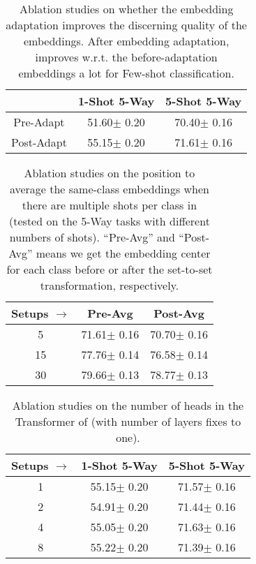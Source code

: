 \begin{table}[tbp]
	\small
	\tabcolsep 5pt
	\centering
	\caption{Ablation studies on whether the embedding adaptation improves the discerning quality of the embeddings. After embedding adaptation, \feat improves w.r.t. the before-adaptation embeddings a lot for Few-shot classification.}
	\begin{tabular}{@{\;}ccc@{\;}}
		\addlinespace
		\toprule
		& 1-Shot 5-Way   & 5-Shot 5-Way \\
		\midrule
		Pre-Adapt    & 51.60{\tiny $\pm$ 0.20}  & 70.40{\tiny $\pm$ 0.16} \\
		Post-Adapt  & 55.15{\tiny $\pm$ 0.20}  & 71.61{\tiny $\pm$ 0.16} \\
		\bottomrule
	\end{tabular}
	\label{supp-tab:adapt_ablation}
\end{table}

\begin{table}[tbp]
	\small
	\tabcolsep 5pt
	\centering
	\caption{Ablation studies on the position to average the same-class embeddings when there are multiple shots per class in {\feat} (tested on the 5-Way tasks with different numbers of shots). ``Pre-Avg'' and ``Post-Avg'' means we get the embedding center for each class before or after the set-to-set transformation, respectively.}
	\begin{tabular}{@{\;}ccc@{\;}}
		\addlinespace
		\toprule
		Setups $\rightarrow$ & Pre-Avg & Post-Avg \\
		\midrule
		5     & 71.61{\tiny $\pm$ 0.16} & 70.70{\tiny $\pm$ 0.16}  \\
		15     & 77.76{\tiny $\pm$ 0.14} & 76.58{\tiny $\pm$ 0.14} \\
		30     & 79.66{\tiny $\pm$ 0.13} & 78.77{\tiny $\pm$ 0.13} \\
		\bottomrule
	\end{tabular}
	\label{supp-tab:shot_change}
\end{table}

\begin{table}[tbp]
	\small
	\tabcolsep 5pt
	\centering
	\caption{Ablation studies on the number of heads in the Transformer of {\feat} (with number of layers fixes to one).}
	\begin{tabular}{@{\;}ccc@{\;}}
		\addlinespace
		\toprule
		Setups $\rightarrow$ & 1-Shot 5-Way & 5-Shot 5-Way \\
		\midrule
		1     & 55.15{\tiny $\pm$ 0.20} & 71.57{\tiny $\pm$ 0.16}  \\
		2     & 54.91{\tiny $\pm$ 0.20} & 71.44{\tiny $\pm$ 0.16} \\
		4     & 55.05{\tiny $\pm$ 0.20} & 71.63{\tiny $\pm$ 0.16} \\
		8     & 55.22{\tiny $\pm$ 0.20} & 71.39{\tiny $\pm$ 0.16} \\
		\bottomrule
	\end{tabular}
	\label{supp-tab:component_head}
\end{table}

